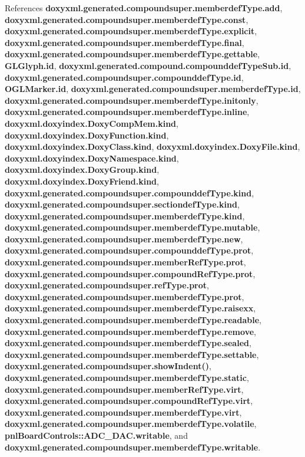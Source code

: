 References {\bf doxyxml.\+generated.\+compoundsuper.\+memberdef\+Type.\+add}, {\bf doxyxml.\+generated.\+compoundsuper.\+memberdef\+Type.\+const}, {\bf doxyxml.\+generated.\+compoundsuper.\+memberdef\+Type.\+explicit}, {\bf doxyxml.\+generated.\+compoundsuper.\+memberdef\+Type.\+final}, {\bf doxyxml.\+generated.\+compoundsuper.\+memberdef\+Type.\+gettable}, {\bf G\+L\+Glyph.\+id}, {\bf doxyxml.\+generated.\+compound.\+compounddef\+Type\+Sub.\+id}, {\bf doxyxml.\+generated.\+compoundsuper.\+compounddef\+Type.\+id}, {\bf O\+G\+L\+Marker.\+id}, {\bf doxyxml.\+generated.\+compoundsuper.\+memberdef\+Type.\+id}, {\bf doxyxml.\+generated.\+compoundsuper.\+memberdef\+Type.\+initonly}, {\bf doxyxml.\+generated.\+compoundsuper.\+memberdef\+Type.\+inline}, {\bf doxyxml.\+doxyindex.\+Doxy\+Comp\+Mem.\+kind}, {\bf doxyxml.\+doxyindex.\+Doxy\+Function.\+kind}, {\bf doxyxml.\+doxyindex.\+Doxy\+Class.\+kind}, {\bf doxyxml.\+doxyindex.\+Doxy\+File.\+kind}, {\bf doxyxml.\+doxyindex.\+Doxy\+Namespace.\+kind}, {\bf doxyxml.\+doxyindex.\+Doxy\+Group.\+kind}, {\bf doxyxml.\+doxyindex.\+Doxy\+Friend.\+kind}, {\bf doxyxml.\+generated.\+compoundsuper.\+compounddef\+Type.\+kind}, {\bf doxyxml.\+generated.\+compoundsuper.\+sectiondef\+Type.\+kind}, {\bf doxyxml.\+generated.\+compoundsuper.\+memberdef\+Type.\+kind}, {\bf doxyxml.\+generated.\+compoundsuper.\+memberdef\+Type.\+mutable}, {\bf doxyxml.\+generated.\+compoundsuper.\+memberdef\+Type.\+new}, {\bf doxyxml.\+generated.\+compoundsuper.\+compounddef\+Type.\+prot}, {\bf doxyxml.\+generated.\+compoundsuper.\+member\+Ref\+Type.\+prot}, {\bf doxyxml.\+generated.\+compoundsuper.\+compound\+Ref\+Type.\+prot}, {\bf doxyxml.\+generated.\+compoundsuper.\+ref\+Type.\+prot}, {\bf doxyxml.\+generated.\+compoundsuper.\+memberdef\+Type.\+prot}, {\bf doxyxml.\+generated.\+compoundsuper.\+memberdef\+Type.\+raisexx}, {\bf doxyxml.\+generated.\+compoundsuper.\+memberdef\+Type.\+readable}, {\bf doxyxml.\+generated.\+compoundsuper.\+memberdef\+Type.\+remove}, {\bf doxyxml.\+generated.\+compoundsuper.\+memberdef\+Type.\+sealed}, {\bf doxyxml.\+generated.\+compoundsuper.\+memberdef\+Type.\+settable}, {\bf doxyxml.\+generated.\+compoundsuper.\+show\+Indent()}, {\bf doxyxml.\+generated.\+compoundsuper.\+memberdef\+Type.\+static}, {\bf doxyxml.\+generated.\+compoundsuper.\+member\+Ref\+Type.\+virt}, {\bf doxyxml.\+generated.\+compoundsuper.\+compound\+Ref\+Type.\+virt}, {\bf doxyxml.\+generated.\+compoundsuper.\+memberdef\+Type.\+virt}, {\bf doxyxml.\+generated.\+compoundsuper.\+memberdef\+Type.\+volatile}, {\bf pnl\+Board\+Controls\+::\+A\+D\+C\+\_\+\+D\+A\+C.\+writable}, and {\bf doxyxml.\+generated.\+compoundsuper.\+memberdef\+Type.\+writable}.



